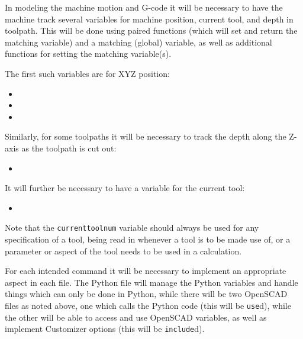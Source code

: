 \documentclass{ltxdoc}
\begin{document}
In modeling the machine motion and G-code it will be necessary to have the machine track several variables for machine position, current tool, and depth in toolpath. This will be done using paired functions (which will set and return the  matching variable) and a matching (global) variable, as well as additional functions for setting the matching variable(s).

\begin{samepage}
The first such variables are for XYZ position:

\begin{itemize}
 \item {}
 \item {}
 \item {}
\end{itemize}
\end{samepage}

\begin{samepage}
\noindent Similarly, for some toolpaths it will be necessary to track the depth along the Z-axis as the toolpath is cut out:
 
\begin{itemize}
 \item {}
\end{itemize}
\end{samepage}

\begin{samepage}
\noindent It will further be necessary to have a variable for the current tool:

\begin{itemize}
 \item {}
\end{itemize}
\end{samepage}

Note that the \verb|currenttoolnum| variable should always be used for any specification of a tool, being read in whenever a tool is to be made use of, or a parameter or aspect of the tool needs to be used in a calculation. %

For each intended command it will be necessary to implement an appropriate aspect in each file. The Python file will manage the Python variables and handle things which can only be done in Python, while there will be two OpenSCAD files as noted above, one which calls the Python code (this will be \texttt{use}d), while the other will be able to access and use OpenSCAD variables, as well as implement Customizer options (this will be \texttt{include}d).
\end{document}
